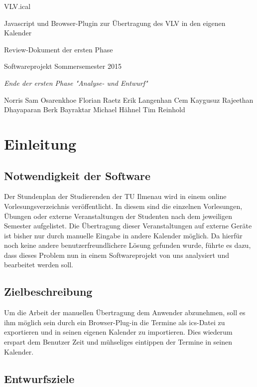 \documentclass[11pt]{scrreprt}
\begin{document}
\begin{center}
\Huge
VLV.ical

\medskip
\large
Javascript und Browser-Plugin zur \"Ubertragung des VLV in den eigenen Kalender

\vskip 1in
\Large
Review-Dokument der ersten Phase

\large
\vskip 2in
Softwareprojekt Sommersemester 2015

\medskip
\textit{
Ende der ersten Phase "Analyse- und Entwurf"
}
\vskip 3in

\normalsize
\textup{ 
Norris Sam Osarenkhoe \qquad
Florian Raetz \qquad
}
\textup{ 
Erik Langenhan \qquad
Cem Kaygusuz \qquad
}
\textup{ 
Rajeethan Dhayaparan \qquad
Berk Bayraktar \qquad
}
\textup{ 
Michael H\"ahnel \qquad
Tim Reinhold
}
\end{center}

\newpage
\tableofcontents

\newpage
\chapter{Einleitung}

\section{Notwendigkeit der Software}

\normalsize \normalfont \textnormal
Der Stundenplan der Studierenden der TU Ilmenau wird in einem online Vorlesungsverzeichnis veröffentlicht. In diesem sind die einzelnen Vorlesungen, Übungen oder externe Veranstaltungen der Studenten nach dem jeweiligen Semester aufgelistet. Die Übertragung dieser Veranstaltungen auf externe Geräte ist bisher nur durch manuelle Eingabe in andere Kalender möglich. Da hierfür noch keine andere benutzerfreundlichere Lösung gefunden wurde, führte es dazu, dass dieses Problem nun in einem Softwareprojekt von uns analysiert und bearbeitet werden soll.  

\section{Zielbeschreibung}
Um die Arbeit der manuellen Übertragung dem Anwender abzunehmen, soll es ihm möglich sein durch ein Browser-Plug-in die Termine als ics-Datei zu exportieren und in seinen eigenen Kalender zu importieren. Dies wiederum erspart dem Benutzer Zeit und mühseliges eintippen der Termine in seinen Kalender.

\section{Entwurfsziele}
\end{document}

